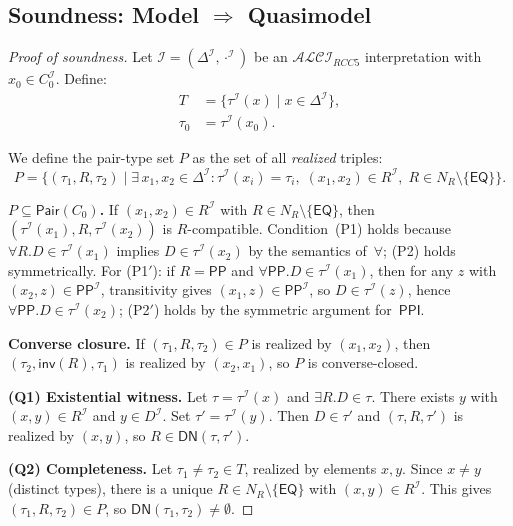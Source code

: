 \documentclass[a4paper,11pt]{article}
\theoremstyle{definition}
\newcommand{\ALCIRCC}[1]{\ensuremath{\mathcal{ALCI}_{\mathit{RCC#1}}}}
\newcommand{\NR}{\ensuremath{N_R}}
\newcommand{\DeltaI}{\ensuremath{\Delta^{\mathcal{I}}}}
\newcommand{\interp}{\ensuremath{\mathcal{I}}}
\newcommand{\EQ}{\ensuremath{\mathsf{EQ}}}
\newcommand{\PP}{\ensuremath{\mathsf{PP}}}
\newcommand{\PPI}{\ensuremath{\mathsf{PPI}}}
\newcommand{\inv}{\ensuremath{\mathsf{inv}}}
\newcommand{\Pair}{\ensuremath{\mathsf{Pair}}}
\begin{document}
\subsection{Soundness: Model $\Rightarrow$ Quasimodel}
\label{sec:soundness}

\begin{proof}[Proof of soundness]
Let $\interp = (\DeltaI, \cdot^{\interp})$ be an $\ALCIRCC{5}$
interpretation with $x_0 \in C_0^{\interp}$.  Define:
\begin{align*}
  T &= \{\tau^{\interp}(x) \mid x \in \DeltaI\}, \\
  \tau_0 &= \tau^{\interp}(x_0).
\end{align*}

\noindent
We define the pair-type set $P$ as the set of all \emph{realized}
triples:
\[
  P = \{(\tau_1, R, \tau_2) \mid
    \exists\, x_1, x_2 \in \DeltaI\colon
    \tau^{\interp}(x_i) = \tau_i,\;
    (x_1, x_2) \in R^{\interp},\;
    R \in \NR \setminus \{\EQ\}\}.
\]

\smallskip\noindent
\textbf{$P \subseteq \Pair(C_0)$.}\;
If $(x_1, x_2) \in R^{\interp}$ with $R \in \NR \setminus \{\EQ\}$,
then $(\tau^{\interp}(x_1), R, \tau^{\interp}(x_2))$ is $R$-compatible.
Condition~(P1) holds because $\forall R.D \in \tau^{\interp}(x_1)$
implies $D \in \tau^{\interp}(x_2)$ by the semantics of~$\forall$; (P2)
holds symmetrically.  For (P1$'$): if $R = \PP$ and $\forall \PP.D
\in \tau^{\interp}(x_1)$, then for any $z$ with $(x_2,z) \in
\PP^{\interp}$, transitivity gives $(x_1,z) \in \PP^{\interp}$, so $D
\in \tau^{\interp}(z)$, hence $\forall \PP.D \in \tau^{\interp}(x_2)$;
(P2$'$) holds by the symmetric argument for~$\PPI$.

\smallskip\noindent
\textbf{Converse closure.}\; If $(\tau_1, R, \tau_2) \in P$ is realized
by $(x_1, x_2)$, then $(\tau_2, \inv(R), \tau_1)$ is realized by
$(x_2, x_1)$, so $P$ is converse-closed.

\smallskip\noindent
\textbf{(Q1) Existential witness.}\; Let $\tau = \tau^{\interp}(x)$
and $\exists R.D \in \tau$.  There exists $y$ with $(x,y) \in
R^{\interp}$ and $y \in D^{\interp}$.  Set $\tau' = \tau^{\interp}(y)$.
Then $D \in \tau'$ and $(\tau, R, \tau')$ is realized by $(x, y)$,
so $R \in \mathsf{DN}(\tau, \tau')$.

\smallskip\noindent
\textbf{(Q2) Completeness.}\; Let $\tau_1 \neq \tau_2 \in T$, realized
by elements $x, y$.  Since $x \neq y$ (distinct types), there is a
unique $R \in \NR \setminus \{\EQ\}$ with $(x,y) \in R^{\interp}$.
This gives $(\tau_1, R, \tau_2) \in P$, so $\mathsf{DN}(\tau_1,
\tau_2) \neq \emptyset$.


\end{proof}
\end{document}
